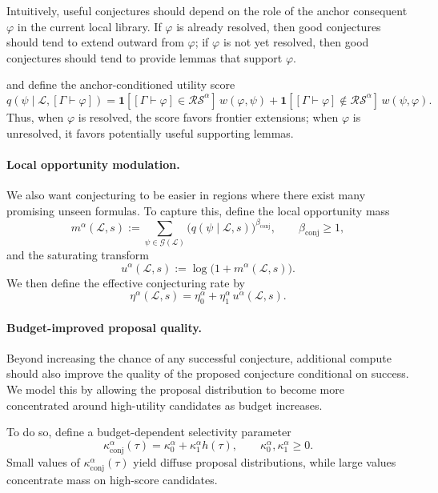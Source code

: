 \documentclass[letterpaper]{article} %
\renewcommand{\phi}{\varphi}
\newcommand{\proves}{\vdash}
\begin{document}
Intuitively, useful conjectures should depend on the role of the anchor consequent $\phi$ in the current local library. If $\phi$ is already resolved, then good conjectures should tend to extend outward from $\phi$; if $\phi$ is not yet resolved, then good conjectures should tend to provide lemmas that support $\phi$.

and define the anchor-conditioned utility score
\[
q(\psi\mid \mathcal L,[\Gamma\proves\phi])
=
\mathbf 1[[\Gamma\proves\phi]\in\mathcal {RS}^\alpha]\,w(\phi,\psi)
+
\mathbf 1[[\Gamma\proves\phi]\notin\mathcal {RS}^\alpha]\,w(\psi,\phi).
\]
Thus, when $\phi$ is resolved, the score favors frontier extensions; when $\phi$ is unresolved, it favors potentially useful supporting lemmas.

\paragraph{Local opportunity modulation.}
We also want conjecturing to be easier in regions where there exist many promising unseen formulas. To capture this, define the local opportunity mass
\[
m^\alpha(\mathcal L,s)
:=
\sum_{\psi\in\mathcal G(\mathcal L)} \big(q(\psi\mid \mathcal L,s)\big)^{\beta_{\mathrm{conj}}},
\qquad
\beta_{\mathrm{conj}}\ge 1,
\]
and the saturating transform
\[
u^\alpha(\mathcal L,s):=\log\big(1+m^\alpha(\mathcal L,s)\big).
\]
We then define the effective conjecturing rate by
\[
\eta^\alpha(\mathcal L,s)
=
\eta_0^\alpha+\eta_1^\alpha\,u^\alpha(\mathcal L,s).
\]

\paragraph{Budget-improved proposal quality.}
Beyond increasing the chance of any successful conjecture, additional compute should also improve the quality of the proposed conjecture conditional on success. We model this by allowing the proposal distribution to become more concentrated around high-utility candidates as budget increases.

To do so, define a budget-dependent selectivity parameter
\[
\kappa^\alpha_{\mathrm{conj}}(\tau)
=
\kappa^\alpha_0+\kappa^\alpha_1 h(\tau),
\qquad
\kappa^\alpha_0,\kappa^\alpha_1\ge 0.
\]
Small values of $\kappa^\alpha_{\mathrm{conj}}(\tau)$ yield diffuse proposal distributions, while large values concentrate mass on high-score candidates.
\end{document}

